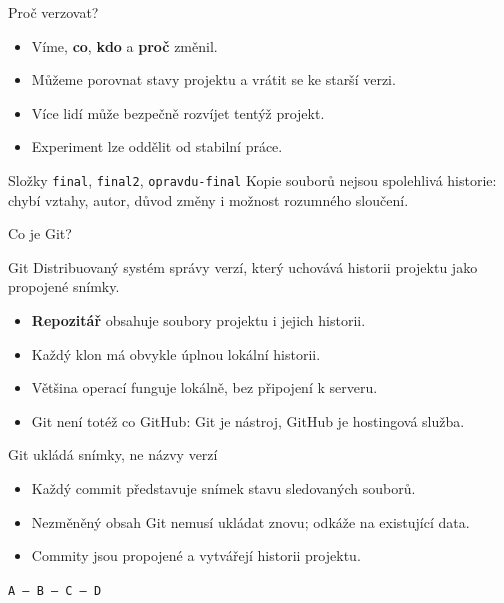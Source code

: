 \documentclass[aspectratio=169]{beamer}
\newcommand{\term}[1]{\textcolor{CodeBlue}{\textbf{#1}}}
\begin{document}
\begin{frame}{Proč verzovat?}
  \begin{itemize}
    \item Víme, \textbf{co}, \textbf{kdo} a \textbf{proč} změnil.
    \item Můžeme porovnat stavy projektu a vrátit se ke starší verzi.
    \item Více lidí může bezpečně rozvíjet tentýž projekt.
    \item Experiment lze oddělit od stabilní práce.
  \end{itemize}
  \begin{alertblock}{Složky \texttt{final}, \texttt{final2}, \texttt{opravdu-final}}
    Kopie souborů nejsou spolehlivá historie: chybí vztahy, autor, důvod změny i možnost rozumného sloučení.
  \end{alertblock}
\end{frame}

\begin{frame}{Co je Git?}
  \begin{block}{Git}
    Distribuovaný systém správy verzí, který uchovává historii projektu jako propojené snímky.
  \end{block}
  \begin{itemize}
    \item \term{Repozitář} obsahuje soubory projektu i jejich historii.
    \item Každý klon má obvykle úplnou lokální historii.
    \item Většina operací funguje lokálně, bez připojení k serveru.
    \item Git není totéž co GitHub: Git je nástroj, GitHub je hostingová služba.
  \end{itemize}
\end{frame}

\begin{frame}{Git ukládá snímky, ne názvy verzí}
  \begin{itemize}
    \item Každý commit představuje snímek stavu sledovaných souborů.
    \item Nezměněný obsah Git nemusí ukládat znovu; odkáže na existující data.
    \item Commity jsou propojené a vytvářejí historii projektu.
  \end{itemize}
  \centering
  \vspace{0.5cm}
  \texttt{A --- B --- C --- D}
\end{frame}
\end{document}
